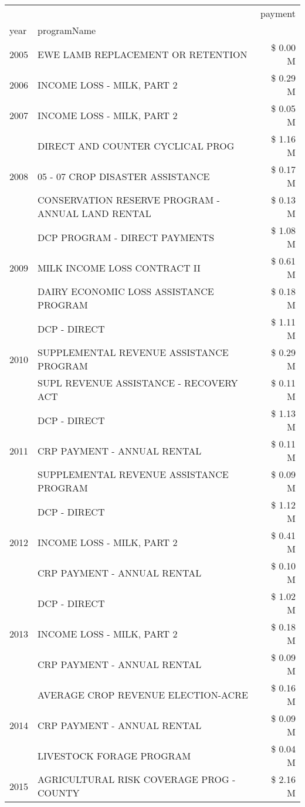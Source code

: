 \begin{tabular}{llr}
\toprule
 &  & payment \\
year & programName &  \\
\midrule
2005 & EWE LAMB REPLACEMENT OR RETENTION & \$ 0.00 M \\
\cline{1-3}
2006 & INCOME LOSS - MILK, PART 2 & \$ 0.29 M \\
\cline{1-3}
2007 & INCOME LOSS - MILK, PART 2 & \$ 0.05 M \\
\cline{1-3}
\multirow[t]{3}{*}{2008} & DIRECT AND COUNTER CYCLICAL PROG & \$ 1.16 M \\
 & 05 - 07 CROP DISASTER ASSISTANCE & \$ 0.17 M \\
 & CONSERVATION RESERVE PROGRAM - ANNUAL LAND RENTAL & \$ 0.13 M \\
\cline{1-3}
\multirow[t]{3}{*}{2009} & DCP PROGRAM - DIRECT PAYMENTS & \$ 1.08 M \\
 & MILK INCOME LOSS CONTRACT II & \$ 0.61 M \\
 & DAIRY ECONOMIC LOSS ASSISTANCE PROGRAM & \$ 0.18 M \\
\cline{1-3}
\multirow[t]{3}{*}{2010} & DCP - DIRECT & \$ 1.11 M \\
 & SUPPLEMENTAL REVENUE ASSISTANCE PROGRAM & \$ 0.29 M \\
 & SUPL REVENUE ASSISTANCE - RECOVERY ACT & \$ 0.11 M \\
\cline{1-3}
\multirow[t]{3}{*}{2011} & DCP - DIRECT & \$ 1.13 M \\
 & CRP PAYMENT - ANNUAL RENTAL & \$ 0.11 M \\
 & SUPPLEMENTAL REVENUE ASSISTANCE PROGRAM & \$ 0.09 M \\
\cline{1-3}
\multirow[t]{3}{*}{2012} & DCP - DIRECT & \$ 1.12 M \\
 & INCOME LOSS - MILK, PART 2 & \$ 0.41 M \\
 & CRP PAYMENT - ANNUAL RENTAL & \$ 0.10 M \\
\cline{1-3}
\multirow[t]{3}{*}{2013} & DCP - DIRECT & \$ 1.02 M \\
 & INCOME LOSS - MILK, PART 2 & \$ 0.18 M \\
 & CRP PAYMENT - ANNUAL RENTAL & \$ 0.09 M \\
\cline{1-3}
\multirow[t]{3}{*}{2014} & AVERAGE CROP REVENUE ELECTION-ACRE & \$ 0.16 M \\
 & CRP PAYMENT - ANNUAL RENTAL & \$ 0.09 M \\
 & LIVESTOCK FORAGE PROGRAM & \$ 0.04 M \\
\cline{1-3}
\multirow[t]{3}{*}{2015} & AGRICULTURAL RISK COVERAGE PROG - COUNTY & \$ 2.16 M \\

\end{tabular}

